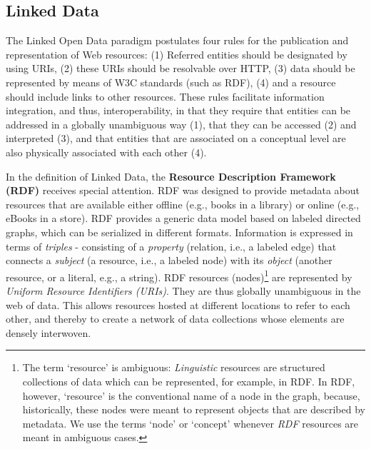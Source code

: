 \subsection{Linked Data}

The Linked Open Data paradigm postulates four rules for the publication and representation of Web resources:
(1) Referred entities should be designated by using URIs,
(2) these URIs should be resolvable over HTTP,
(3) data should be represented by means of W3C standards (such as RDF),
(4) and a resource should include links to other resources.
These rules facilitate information integration, and thus, interoperability, in that they require that entities can be addressed in a globally unambiguous way (1), that they can be accessed (2) and interpreted (3), and that entities that are associated on a conceptual level are also physically associated with each other (4).

In the definition of Linked Data, the \textbf{Resource Description Framework (RDF)} receives special attention. RDF was designed to provide metadata about resources that are available either offline (e.g., books in a library) or online (e.g., eBooks in a store). RDF provides a generic data model based on labeled directed %
graphs, which can be serialized in different formats. Information is expressed in terms of \emph{triples} - consisting of a \emph{property} (relation, i.e., a labeled edge) that connects a \emph{subject} (a resource, i.e., a labeled node) with its \emph{object} (another resource, or a literal, e.g., a string).
RDF resources (nodes)\footnote{
    The term `resource' is ambiguous: \emph{Linguistic} resources are structured collections of data which can be represented, for example, in RDF. In RDF, however, `resource' is the conventional name of a node in the graph, because, historically, these nodes were meant to represent objects that are described by metadata. We use the terms `node' or `concept' whenever \emph{RDF} resources are meant in ambiguous cases.
} are represented by \emph{Uniform Resource Identifiers (URIs)}. They are thus globally unambiguous in the web of data. This allows resources hosted at different locations to refer to each other, and thereby to create a network of data collections whose elements are densely interwoven.

